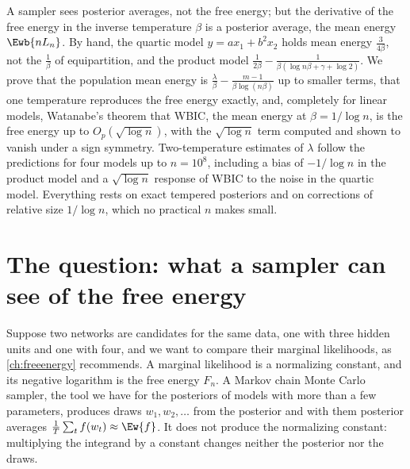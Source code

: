 \newcommand{\temperatureE}{\mathcal{E}}   %
\newcommand{\temperatureC}{\mathcal{C}}   %
\newcommand{\temperatureZ}{\mathcal{Z}}   %
\newcommand{\temperaturekQ}{\kappa_{\mathrm{Q}}}

\begin{refsection}

\begin{chaptersummary}
A sampler sees posterior averages, not the free energy; but the derivative of the free energy in the inverse temperature $\beta$ is a posterior average, the mean energy $\Ewb{nL_n}$. By hand, the quartic model $y=ax_1+b^2x_2$ holds mean energy $\frac{3}{4\beta}$, not the $\frac1\beta$ of equipartition, and the product model $\frac{1}{2\beta}-\frac{1}{\beta(\log n\beta+\gamma+\log 2)}$. We prove that the population mean energy is $\frac\lambda\beta-\frac{m-1}{\beta\log(n\beta)}$ up to smaller terms, that one temperature reproduces the free energy exactly, and, completely for linear models, Watanabe's theorem that WBIC, the mean energy at $\beta=1/\log n$, is the free energy up to $O_p(\sqrt{\log n})$, with the $\sqrt{\log n}$ term computed and shown to vanish under a sign symmetry. Two-temperature estimates of $\lambda$ follow the predictions for four models up to $n=10^8$, including a bias of $-1/\log n$ in the product model and a $\sqrt{\log n}$ response of WBIC to the noise in the quartic model. Everything rests on exact tempered posteriors and on corrections of relative size $1/\log n$, which no practical $n$ makes small.
\end{chaptersummary}

\section{The question: what a sampler can see of the free energy}\label{sec:temperature:question}

Suppose two networks are candidates for the same data, one with three hidden units and one with four, and we want to compare their marginal likelihoods, as \cref{ch:freeenergy} recommends. A marginal likelihood is a normalizing constant, and its negative logarithm is the free energy $F_n$. A Markov chain Monte Carlo sampler, the tool we have for the posteriors of models with more than a few parameters, produces draws $w_1,w_2,\dots$ from the posterior and with them posterior averages $\frac1T\sum_tf(w_t)\approx\Ew{f}$. It does not produce the normalizing constant: multiplying the integrand by a constant changes neither the posterior nor the draws.


\end{refsection}
